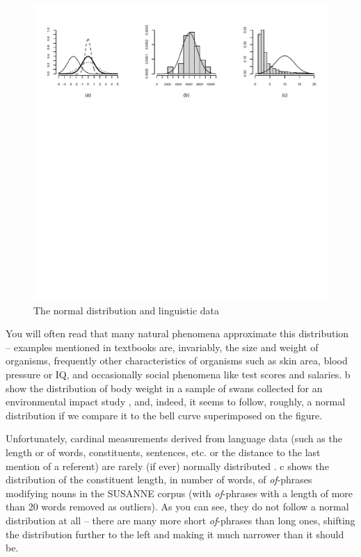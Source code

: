 \begin{figure}
\caption{The normal distribution and linguistic data}
\label{fig:normdist}
\includegraphics[width=\textwidth,keepaspectratio]{figures/normdist}
\end{figure}

You will often read that many natural phenomena approximate this distribution -- examples mentioned in textbooks are, invariably, the size and weight of organisms, frequently other characteristics of organisms such as skin area, blood pressure or IQ, and occasionally social phenomena like test scores and salaries. b show the distribution of body weight in a sample of swans collected for an environmental impact study \citep{fite_residues_1979}, and, indeed, it seems to follow, roughly, a normal distribution  if we compare it to the bell curve superimposed on the figure.

Unfortunately, cardinal  measurements  derived from language data (such as the length  or of words, constituents, sentences, etc. or the distance  to the last mention of a referent) are rarely (if ever) normally distributed \citep[see, e.g.,][51]{mcenery_corpus_2012}. c shows the distribution of the constituent length,  in number of words, of \textit{of}-phrases modifying nouns  in the SUSANNE corpus (with \textit{of}-phrases with a length of more than 20 words removed as outliers). As you can see, they do not follow a normal distribution  at all -- there are many more short \textit{of}-phrases than long ones, shifting the distribution further to the left and making it much narrower than it should be.

